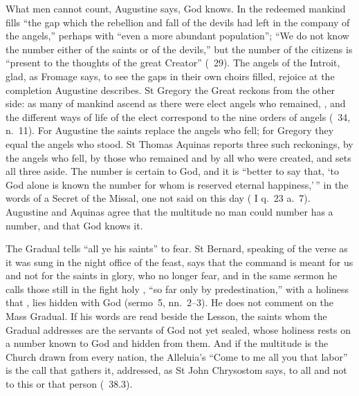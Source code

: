 What men cannot count, Augustine says, God knows. In the
 redeemed mankind fills ``the gap which the rebellion and
fall of the devils had left in the company of the angels,'' perhaps with
``even a more abundant population''; ``We do not know the number either of the
saints or of the devils,'' but the number of the citizens is ``present to the
thoughts of the great Creator'' (\ 29). The angels of the Introit,
glad, as Fromage says, to see the gaps in their own choirs filled, rejoice at
the completion Augustine describes. St Gregory the Great reckons
from the other side: as many of mankind ascend as there were elect angels who
remained, , and the
different ways of life of the elect correspond to the nine orders of angels
(\ 34, n.~11). For Augustine the saints replace the angels
who fell; for Gregory they equal the angels who stood. St Thomas Aquinas
reports three such reckonings, by the angels who fell, by those who remained
and by all who were created, and sets all three aside. The number is certain to God, and it is
``better to say that, `to God alone is known the number for whom is reserved
eternal happiness,'\,'' in the words of a Secret of the Missal, one not
said on this day ( I q.~23 a.~7). Augustine and Aquinas agree that the
multitude no man could number has a number, and that God knows it.

The Gradual tells ``all ye his saints'' to fear. St Bernard, speaking of the
verse as it was sung in the night office of the feast, says that the command
is meant for us and not for the saints in glory, who no longer fear, and in
the same sermon he calls those still in
the fight holy , ``so far only by
predestination,'' with a holiness that , lies
hidden with God (sermo~5, nn.~2--3). He does not comment on the Mass Gradual.
If his words are read beside the Lesson, the saints whom the Gradual
addresses are the servants of God not yet sealed, whose holiness rests on a
number known to God and hidden from them. And if the multitude is the Church drawn from every nation, the
Alleluia's ``Come to me all you that labor'' is the call that gathers it,
addressed, as St John Chrysostom says, to all and not to this or that person
(\ 38.3).

